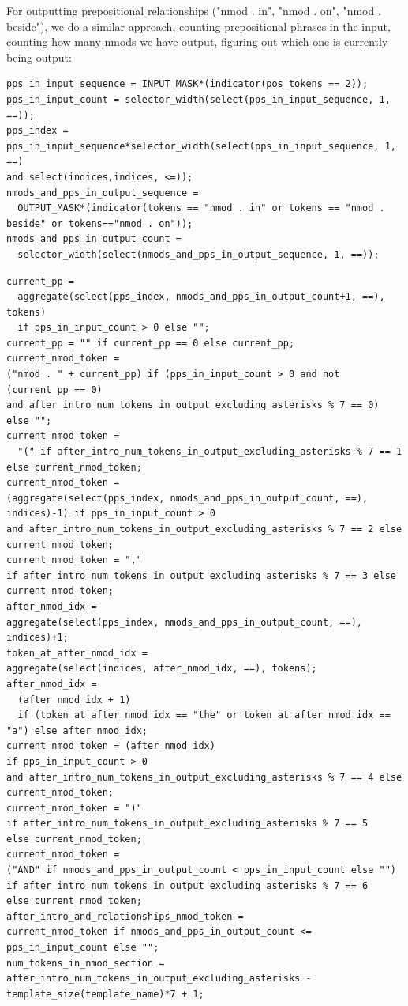 \documentclass[11pt]{article}
\begin{document}
For outputting prepositional relationships ("nmod . in", "nmod . on", "nmod . beside"), we do a similar approach, counting prepositional phrases in the input, counting how many nmods we have output, figuring out which one is currently being output:

\begin{tiny}
\begin{verbatim}
pps_in_input_sequence = INPUT_MASK*(indicator(pos_tokens == 2));
pps_in_input_count = selector_width(select(pps_in_input_sequence, 1, ==));
pps_index = pps_in_input_sequence*selector_width(select(pps_in_input_sequence, 1, ==) 
and select(indices,indices, <=));
nmods_and_pps_in_output_sequence = 
  OUTPUT_MASK*(indicator(tokens == "nmod . in" or tokens == "nmod . beside" or tokens=="nmod . on"));
nmods_and_pps_in_output_count = 
  selector_width(select(nmods_and_pps_in_output_sequence, 1, ==));
\end{verbatim}
\end{tiny}

\begin{tiny}
\begin{verbatim}
current_pp = 
  aggregate(select(pps_index, nmods_and_pps_in_output_count+1, ==), tokens) 
  if pps_in_input_count > 0 else "";
current_pp = "" if current_pp == 0 else current_pp;
current_nmod_token = 
("nmod . " + current_pp) if (pps_in_input_count > 0 and not (current_pp == 0) 
and after_intro_num_tokens_in_output_excluding_asterisks % 7 == 0) else "";
current_nmod_token = 
  "(" if after_intro_num_tokens_in_output_excluding_asterisks % 7 == 1 else current_nmod_token;
current_nmod_token = 
(aggregate(select(pps_index, nmods_and_pps_in_output_count, ==), indices)-1) if pps_in_input_count > 0 
and after_intro_num_tokens_in_output_excluding_asterisks % 7 == 2 else current_nmod_token;
current_nmod_token = "," 
if after_intro_num_tokens_in_output_excluding_asterisks % 7 == 3 else current_nmod_token;
after_nmod_idx = 
aggregate(select(pps_index, nmods_and_pps_in_output_count, ==), indices)+1;
token_at_after_nmod_idx = 
aggregate(select(indices, after_nmod_idx, ==), tokens);
after_nmod_idx = 
  (after_nmod_idx + 1) 
  if (token_at_after_nmod_idx == "the" or token_at_after_nmod_idx == "a") else after_nmod_idx;
current_nmod_token = (after_nmod_idx) 
if pps_in_input_count > 0 
and after_intro_num_tokens_in_output_excluding_asterisks % 7 == 4 else current_nmod_token;
current_nmod_token = ")" 
if after_intro_num_tokens_in_output_excluding_asterisks % 7 == 5 
else current_nmod_token;
current_nmod_token = 
("AND" if nmods_and_pps_in_output_count < pps_in_input_count else "") 
if after_intro_num_tokens_in_output_excluding_asterisks % 7 == 6 
else current_nmod_token;
after_intro_and_relationships_nmod_token = 
current_nmod_token if nmods_and_pps_in_output_count <= pps_in_input_count else "";
num_tokens_in_nmod_section = 
after_intro_num_tokens_in_output_excluding_asterisks - template_size(template_name)*7 + 1;
\end{verbatim}
\end{tiny}
\end{document}
